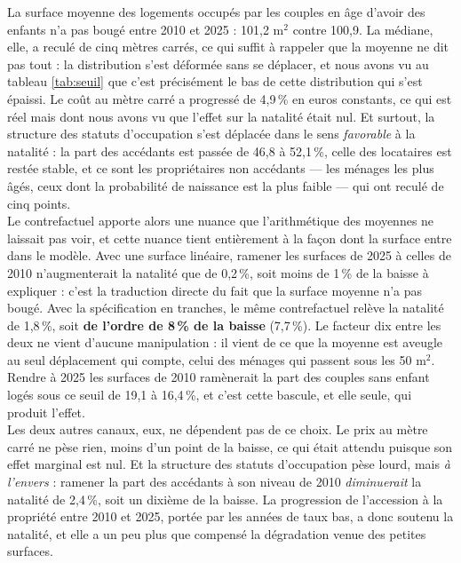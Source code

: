 \documentclass[12pt,a4paper]{article}
\begin{document}
\bigskip

\noindent La surface moyenne des logements occupés par les couples en âge d'avoir des enfants n'a pas bougé entre 2010 et 2025 : 101,2 m$^2$ contre 100,9. La médiane, elle, a reculé de cinq mètres carrés, ce qui suffit à rappeler que la moyenne ne dit pas tout : la distribution s'est déformée sans se déplacer, et nous avons vu au tableau \ref{tab:seuil} que c'est précisément le bas de cette distribution qui s'est épaissi. Le coût au mètre carré a progressé de 4,9\,\% en euros constants, ce qui est réel mais dont nous avons vu que l'effet sur la natalité était nul. Et surtout, la structure des statuts d'occupation s'est déplacée dans le sens \textit{favorable} à la natalité : la part des accédants est passée de 46,8 à 52,1\,\%, celle des locataires est restée stable, et ce sont les propriétaires non accédants — les ménages les plus âgés, ceux dont la probabilité de naissance est la plus faible — qui ont reculé de cinq points. \\

\noindent Le contrefactuel apporte alors une nuance que l'arithmétique des moyennes ne laissait pas voir, et cette nuance tient entièrement à la façon dont la surface entre dans le modèle. Avec une surface linéaire, ramener les surfaces de 2025 à celles de 2010 n'augmenterait la natalité que de 0,2\,\%, soit moins de 1\,\% de la baisse à expliquer : c'est la traduction directe du fait que la surface moyenne n'a pas bougé. Avec la spécification en tranches, le même contrefactuel relève la natalité de 1,8\,\%, soit \textbf{de l'ordre de 8\,\% de la baisse} (7,7\,\%). Le facteur dix entre les deux ne vient d'aucune manipulation : il vient de ce que la moyenne est aveugle au seul déplacement qui compte, celui des ménages qui passent sous les 50 m$^2$. Rendre à 2025 les surfaces de 2010 ramènerait la part des couples sans enfant logés sous ce seuil de 19,1 à 16,4\,\%, et c'est cette bascule, et elle seule, qui produit l'effet. \\

\noindent Les deux autres canaux, eux, ne dépendent pas de ce choix. Le prix au mètre carré ne pèse rien, moins d'un point de la baisse, ce qui était attendu puisque son effet marginal est nul. Et la structure des statuts d'occupation pèse lourd, mais \textit{à l'envers} : ramener la part des accédants à son niveau de 2010 \textit{diminuerait} la natalité de 2,4\,\%, soit un dixième de la baisse. La progression de l'accession à la propriété entre 2010 et 2025, portée par les années de taux bas, a donc soutenu la natalité, et elle a un peu plus que compensé la dégradation venue des petites surfaces. \\
\end{document}
